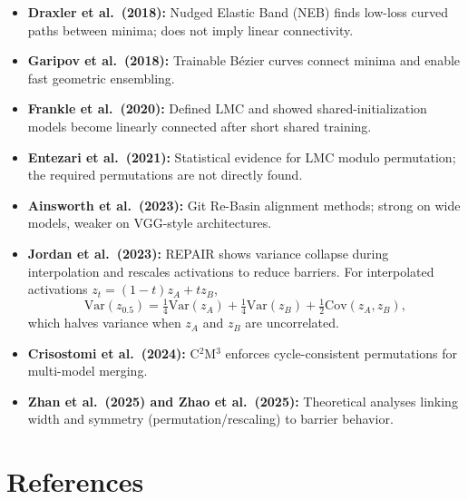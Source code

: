 \documentclass[11pt,a4paper]{article}
\begin{document}
\begin{itemize}
    \item \textbf{Draxler et al.\ (2018):} Nudged Elastic Band (NEB) finds low-loss curved paths between minima; does not imply linear connectivity.
    \item \textbf{Garipov et al.\ (2018):} Trainable B\'{e}zier curves connect minima and enable fast geometric ensembling.
    \item \textbf{Frankle et al.\ (2020):} Defined LMC and showed shared-initialization models become linearly connected after short shared training.
    \item \textbf{Entezari et al.\ (2021):} Statistical evidence for LMC modulo permutation; the required permutations are not directly found.
    \item \textbf{Ainsworth et al.\ (2023):} Git Re-Basin alignment methods; strong on wide models, weaker on VGG-style architectures.
    \item \textbf{Jordan et al.\ (2023):} REPAIR shows variance collapse during interpolation and rescales activations to reduce barriers. For interpolated activations $z_t = (1-t)z_A + t z_B$,
    \[
    \mathrm{Var}(z_{0.5}) = \tfrac{1}{4}\mathrm{Var}(z_A) + \tfrac{1}{4}\mathrm{Var}(z_B) + \tfrac{1}{2}\mathrm{Cov}(z_A, z_B),
    \]
    which halves variance when $z_A$ and $z_B$ are uncorrelated.
    \item \textbf{Crisostomi et al.\ (2024):} C$^2$M$^3$ enforces cycle-consistent permutations for multi-model merging.
    \item \textbf{Zhan et al.\ (2025) and Zhao et al.\ (2025):} Theoretical analyses linking width and symmetry (permutation/rescaling) to barrier behavior.
\end{itemize}

\section{References}
\end{document}
